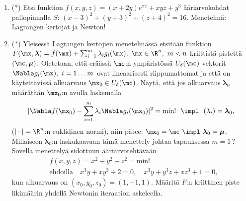 \begin{enumerate}
\item (*)
Etsi funktion $f(x,y,z)=(x+2y)e^{xz}+xyz+y^3$ ääriarvokohdat pallopinnalla
$S:\,(x-3)^2+(y+3)^2+(z+4)^2=16$. Menetelmä: Lagrangen kertojat ja Newton!

\item (*) \label{H-udif-8: lambdan alkuarvaus}
Yleisessä Lagrangen kertojien menetelmässä etsitään funktion
$F(\mx,\boldsymbol{\lambda})=f(\mx)+\sum_{i=1}^m \lambda_i g_i(\mx),\ \mx\in\R^n,\ m<n$
kriittistä pistettä $(\mc,\boldsymbol{\mu})$. Oletetaan, että eräässä $\mc$:n ympäristössä
$U_\delta(\mc)$ vektorit $\Nabla g_i(\mx),\ i=1 \ldots m\,$ ovat lineaarisesti riippumattomat
ja että on käytettävissä alkuarvaus $\mx_0 \in U_\delta(\mc)$. Näytä, että jos alkuarvaus
$\boldsymbol{\lambda}_0$ määrätään $\mx_0$:n avulla laskemalla
\[
|\Nabla f(\mx_0)-\sum_{i=1}^m\lambda_i\Nabla g_i(\mx_0)|^2 = \text{min!} 
                \ \ \impl\ \ (\lambda_i)=\boldsymbol{\lambda}_0,
\]
($|\cdot| = \R^n$:n euklidinen normi), niin pätee:
$\mx_0=\mc\ \impl\ \boldsymbol{\lambda}_0=\boldsymbol{\mu}$. Millaiseen 
$\boldsymbol{\lambda}_0$:n laskukaavaan tämä menettely johtaa tapauksessa $m=1$\,? Sovella
menettelyä sidottuun ääriarvotehtävään
\begin{align*}
&f(x,y,z)=x^2+y^2+z^2 = \text{min!} \\
&\text{ehdoilla} \quad x^3y+xy^3+2=0, \quad x^3y+y^3z+xz^3+1=0,
\end{align*}
kun alkuarvaus on $(x_0,y_0,z_0)=(1,-1,1)$. Määritä $F$:n kriittinen piste likimäärin yhdellä
Newtonin iteraation askeleella.

\end{enumerate}
